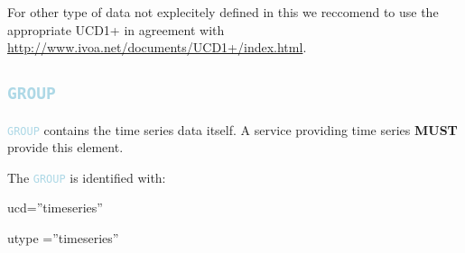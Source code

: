 \documentclass[11pt,a4paper]{ivoa}
\newcommand\elem[1]{\textcolor{LightBlue}{{\tt#1}}}
\begin{document}



For other type of data not explecitely defined in this we reccomend to use the appropriate UCD1+ in agreement with \url{http://www.ivoa.net/documents/UCD1+/index.html}. 

\subsection{\elem{GROUP}}
\elem{GROUP} contains the time series data itself. A service providing time series \textbf{MUST} provide this element.

The \elem{GROUP} is identified with:
\begin{description}
\item ucd=''timeseries'' 
\item utype =''timeseries'' 
\end{description}
\end{document}
